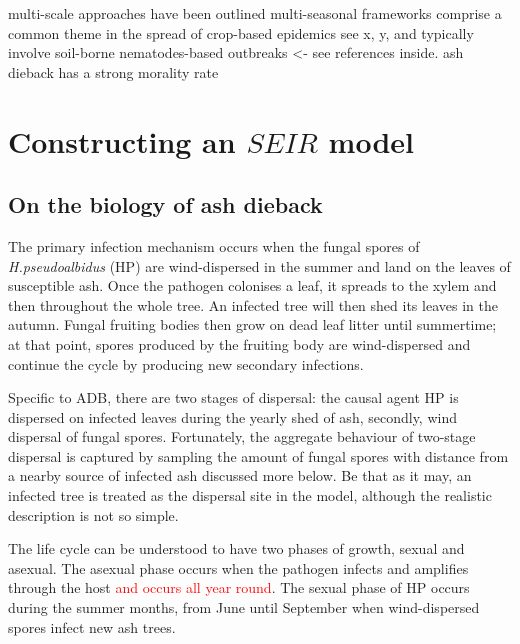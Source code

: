 multi-scale approaches have been outlined \cite{hart2020theoretical}
multi-seasonal frameworks comprise a common theme in the spread of crop-based epidemics see  x, y, and typically involve soil-borne nematodes-based outbreaks \cite{tankam2020modelling} <- see references inside.
ash dieback has a strong morality rate \cite{stocks2017first}

\section{Constructing an $SEIR$ model}

\subsection{On the biology of ash dieback}

The primary infection mechanism occurs when the fungal spores of \textit{H.pseudoalbidus} (HP) are wind-dispersed in the summer and land on the leaves of susceptible ash. Once the pathogen colonises a leaf, it spreads to the xylem and then throughout the whole tree. %
An infected tree will then shed its leaves in the autumn. Fungal fruiting bodies then grow on dead leaf litter until summertime; at that point, spores produced by the fruiting body are wind-dispersed and continue the cycle by producing new secondary infections.%

Specific to ADB, there are two stages of dispersal: the causal agent HP is dispersed on infected leaves during the yearly shed of ash, secondly, wind dispersal of fungal spores. Fortunately, the aggregate behaviour of two-stage dispersal is captured by sampling the amount of fungal spores with distance from a nearby source of infected ash \cite{grosdidier2018tracking}\textemdash discussed more below. 
Be that as it may, an infected tree is treated as the dispersal site in the model, although the realistic description is not so simple.

The life cycle can be understood to have two phases of growth, sexual and asexual. %
The asexual phase occurs when the pathogen infects and amplifies through the host \textcolor{red}{and occurs all year round}. The sexual phase of HP occurs during the summer months, from June until September when wind-dispersed spores infect new ash trees. %

